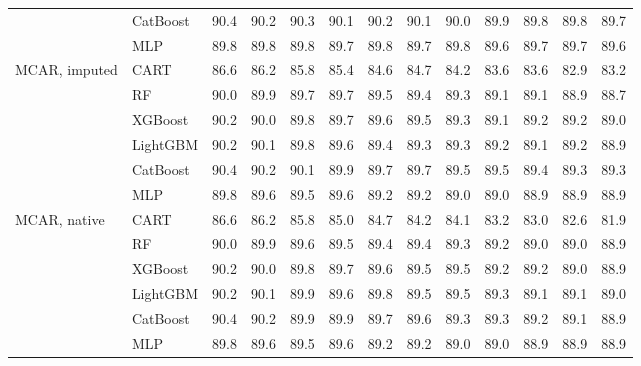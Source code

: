 \begin{table}[p]
\begin{tabular}{@{}llrrrrrrrrrrr@{}}
 & CatBoost & 90.4 & 90.2 & 90.3 & 90.1 & 90.2 & 90.1 & 90.0 & 89.9 & 89.8 & 89.8 & 89.7 \\
 & MLP & 89.8 & 89.8 & 89.8 & 89.7 & 89.8 & 89.7 & 89.8 & 89.6 & 89.7 & 89.7 & 89.6 \\
\midrule
MCAR, imputed & CART & 86.6 & 86.2 & 85.8 & 85.4 & 84.6 & 84.7 & 84.2 & 83.6 & 83.6 & 82.9 & 83.2 \\
 & RF & 90.0 & 89.9 & 89.7 & 89.7 & 89.5 & 89.4 & 89.3 & 89.1 & 89.1 & 88.9 & 88.7 \\
 & XGBoost & 90.2 & 90.0 & 89.8 & 89.7 & 89.6 & 89.5 & 89.3 & 89.1 & 89.2 & 89.2 & 89.0 \\
 & LightGBM & 90.2 & 90.1 & 89.8 & 89.6 & 89.4 & 89.3 & 89.3 & 89.2 & 89.1 & 89.2 & 88.9 \\
 & CatBoost & 90.4 & 90.2 & 90.1 & 89.9 & 89.7 & 89.7 & 89.5 & 89.5 & 89.4 & 89.3 & 89.3 \\
 & MLP & 89.8 & 89.6 & 89.5 & 89.6 & 89.2 & 89.2 & 89.0 & 89.0 & 88.9 & 88.9 & 88.9 \\
\midrule
MCAR, native & CART & 86.6 & 86.2 & 85.8 & 85.0 & 84.7 & 84.2 & 84.1 & 83.2 & 83.0 & 82.6 & 81.9 \\
 & RF & 90.0 & 89.9 & 89.6 & 89.5 & 89.4 & 89.4 & 89.3 & 89.2 & 89.0 & 89.0 & 88.9 \\
 & XGBoost & 90.2 & 90.0 & 89.8 & 89.7 & 89.6 & 89.5 & 89.5 & 89.2 & 89.2 & 89.0 & 88.9 \\
 & LightGBM & 90.2 & 90.1 & 89.9 & 89.6 & 89.8 & 89.5 & 89.5 & 89.3 & 89.1 & 89.1 & 89.0 \\
 & CatBoost & 90.4 & 90.2 & 89.9 & 89.9 & 89.7 & 89.6 & 89.3 & 89.3 & 89.2 & 89.1 & 88.9 \\
 & MLP & 89.8 & 89.6 & 89.5 & 89.6 & 89.2 & 89.2 & 89.0 & 89.0 & 88.9 & 88.9 & 88.9 \\
\bottomrule
\end{tabular}
\end{table}

